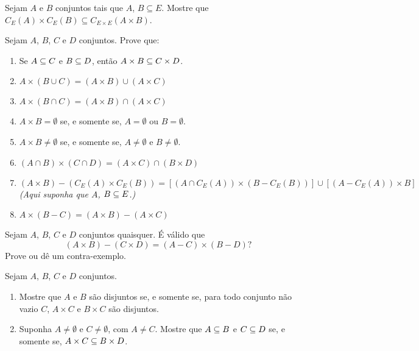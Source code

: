 \documentclass[12pt]{exam}
\begin{document}
\newpage

\questao{} Sejam $A$ e $B$ conjuntos tais que $A$, $B \subseteq E$. Mostre que $C_E(A) \times C_E(B) \subseteq C_{E \times E}(A \times B)$.

\vspace{.3cm}

\questao{} Sejam $A$, $B$, $C$ e $D$ conjuntos. Prove que:
\begin{enumerate}[label={\alph*})]
    \item Se $A \subseteq C$ e $B \subseteq D$, ent\~ao $A \times B \subseteq C \times D$.

    \item $A \times (B \cup C) = (A \times B) \cup (A \times C)$

    \item $A \times (B \cap C) = (A \times B) \cap (A \times C)$

    \item $A \times B = \emptyset$ se, e somente se, $A = \emptyset$ ou $B = \emptyset$.

    \item $A \times B \ne \emptyset$ se, e somente se, $A \ne \emptyset$ e $B \ne \emptyset$.

    \item $(A \cap B) \times (C \cap D) = (A \times C) \cap (B \times D)$

    \item $(A \times B) - (C_E(A) \times C_E(B)) = [(A \cap C_E(A)) \times (B - C_E(B))] \cup [(A - C_E(A)) \times B]$  \textit{(Aqui suponha que $A$, $B \subseteq E$.)}

    \item $A \times (B - C) = (A \times B) - (A \times C)$
\end{enumerate}

\vspace{.3cm}

\questao{} Sejam $A$, $B$, $C$ e $D$ conjuntos quaisquer. É válido que
\[
    (A \times B) - (C \times D) = (A - C) \times (B - D)?
\]
Prove ou dê um contra-exemplo.

\vspace{.3cm}

\questao{} Sejam $A$, $B$, $C$ e $D$ conjuntos.
\begin{enumerate}[label={\alph*})]
    \item Mostre que $A$ e $B$ s\~ao disjuntos se, e somente se, para todo conjunto n\~ao vazio $C$, $A \times C$ e $B \times C$ s\~ao disjuntos.

    \item Suponha $A \ne \emptyset$ e $C \ne \emptyset$, com $A \ne C$. Mostre que $A \subseteq B$ e $C \subseteq D$ se, e somente se, $A \times C \subseteq B \times D$.
\end{enumerate}
\end{document}
